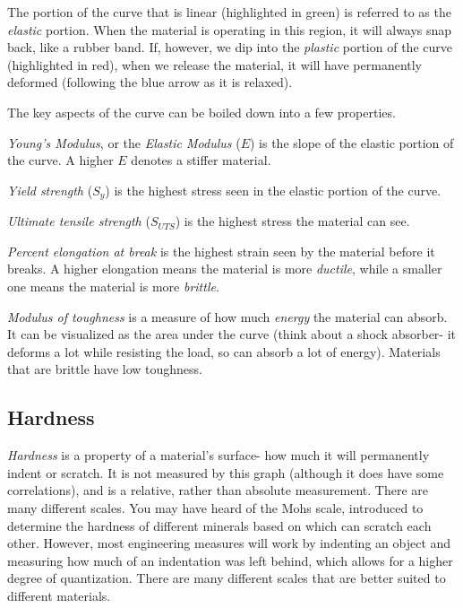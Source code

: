\documentclass[10pt,letterpaper]{book}
\begin{document}
 The portion of the curve that is linear (highlighted in green) is referred to as the \textit{elastic} portion. When the material is operating in this region, it will always snap back, like a rubber band. If, however, we dip into the \textit{plastic} portion of the curve (highlighted in red), when we release the material, it will have permanently deformed (following the blue arrow as it is relaxed).
 
 The key aspects of the curve can be boiled down into a few properties.
 
 \begin{asparaenum}[a)]
 	\item \textit{Young's Modulus}, or the \textit{Elastic Modulus} ($E$) is the slope of the elastic portion of the curve. A higher $E$ denotes a stiffer material.
 	\item \textit{Yield strength} ($S_{y}$) is the highest stress seen in the elastic portion of the curve.
 	\item \textit{Ultimate tensile strength} ($S_{UTS}$) is the highest stress the material can see.
 	\item \textit{Percent elongation at break} is the highest strain seen by the material before it breaks. A higher elongation means the material is more \textit{ductile}, while a smaller one means the material is more \textit{brittle}.
 	\item \textit{Modulus of toughness} is a measure of how much \textit{energy} the material can absorb. It can be visualized as the area under the curve (think about a shock absorber- it deforms a lot while resisting the load, so can absorb a lot of energy). Materials that are brittle have low toughness.
 \end{asparaenum}
 
\subsection{Hardness}

 \textit{Hardness} is a property of a material's surface- how much it will permanently indent or scratch. It is not measured by this graph (although it does have some correlations), and is a relative, rather than absolute measurement. There are many different scales. You may have heard of the Mohs scale, introduced to determine the hardness of different minerals based on which can scratch each other. However, most engineering measures will work by indenting an object and measuring how much of an indentation was left behind, which allows for a higher degree of quantization. There are many different scales that are better suited to different materials.
 
\end{document}
